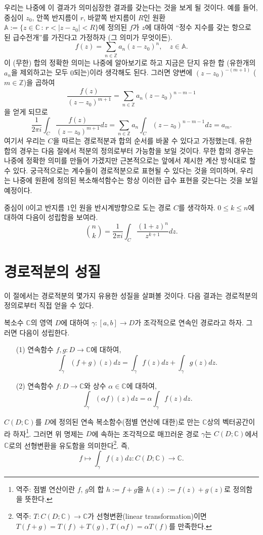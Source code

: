 우리는 나중에 이 결과가 의미심장한 결과를 갖는다는 것을 보게 될 것이다.
예를 들어, 
중심이 $z_0$, 안쪽 반지름이 $r$, 바깥쪽 반지름이 $R$인 
원환 $\mathbb A := \{ z\in\mathbb C \,:\, r<|z-z_0|<R \}$에 정의된
$f$가 $z$에 대하여 ``정수 지수를 갖는 항으로 된 급수전개''를 가진다고 가정하자 
(그 의미가 무엇이든).
\[
f(z) = \sum_{n\in\mathbb Z} a_n (z-z_0)^n, \quad z\in \mathbb A.
\]
이 (무한) 합의 정확한 의미는 나중에 알아보기로 하고
지금은 단지 유한 합 (유한개의 $a_n$을 제외하고는 모두 $0$되는)이라 생각해도 된다.
그러면  양변에 $(z-z_0)^{-(m+1)}$ ($m\in \mathbb Z$)을 곱하여 
\[
\dfrac{f(z)}{(z-z_0)^{m+1}} = \sum_{n\in\mathbb Z} a_n (z-z_0)^{n-m-1}
\]
을 얻게 되므로
\[
\dfrac1{2\pi i} \int_C \frac{f(z)}{(z-z_0)^{m+1}} dz
= \sum_{n\in\mathbb Z} a_n \int_C (z-z_0)^{n-m-1}dz = a_m.
\]
여기서 우리는 $C$을 따르는 경로적분과 합의 순서를 바꿀 수 있다고 가정했는데,
유한 합의 경우는 다음 절에서 적분의 정의로부터 가능함을 보일 것이다.
무한 합의 경우는 나중에 정확한 의미를 만들어 가겠지만 근본적으로는
앞에서 제시한 계산 방식대로 할 수 있다.
궁극적으로는 계수들이 경로적분으로 표현될 수 있다는 것을 의미하며,
우리는 나중에 원환에 정의된 복소해석함수는 항상 이러한 급수 표현을 갖는다는 것을
보일 예정이다.

\begin{salt_exercise} \label{ex-3-5}
중심이 $0$이고 반지름 $1$인 원을 반시계방향으로 도는 경로 $C$를 생각하자.
$0\le k \le n$에 대하여 다음이 성립함을 보여라.
\[
{n \choose k} = \dfrac1{2\pi i}\int_C \dfrac{(1+z)^n}{z^{k+1}} dz.
\]
\end{salt_exercise}

\section{경로적분의 성질}

이 절에서는 경로적분의 몇가지 유용한 성질을 살펴볼 것이다.
다음 결과는 경로적분의 정의로부터 직접 얻을 수 있다.

\begin{saltprop}{}{} \label{prop-3-1}
복소수 $\mathbb C$의 영역 $D$에 대하여
$\gamma: [a,b] \to D$가 조각적으로 연속인 경로라고 하자.
그러면 다음이 성립한다.
\begin{itemize}
\item[(1)] 연속함수 $f,g : D \to \mathbb C$에 대하여,
\[
\int_\gamma (f+g)(z) dz = \int_\gamma f(z)dz + \int_\gamma g(z)dz.
\]
\item[(2)] 연속함수 $f : D \to \mathbb C$와 상수 $\alpha\in\mathbb C$에 대하여,
\[
\int_\gamma  (\alpha f)(z)dz = \alpha \int_\gamma f(z)dz.
\]
\end{itemize}
\end{saltprop}
$C(D;\mathbb C)$를
$D$에 정의된 연속 복소함수(점별 연산에 대한)로 만는 $\mathbb C$상의 
벡터공간이라 하자\footnote{
역주: 점별 연산이란 $f$, $g$의 합 $h:=f+g$을 $h(z):=f(z)+g(z)$로 정의함을 뜻한다.}.
그러면 위 명제는 $D$에 속하는 조각적으로 매끄러운 경로 $\gamma$는
$C(D;\mathbb C)$에서 $\mathbb C$로의 선형변환을 유도함을 
의미한다\footnote{역주: $T: C(D;\mathbb C) \to \mathbb C$가 선형변환(linear transformation)이면
$T(f+g) = T(f)+T(g)$, $T(\alpha f) = \alpha T(f)$를 만족한다. }.
즉,
\[
f \mapsto \int_\gamma f(z)dz : C(D;\mathbb C) \to \mathbb C.
\]

